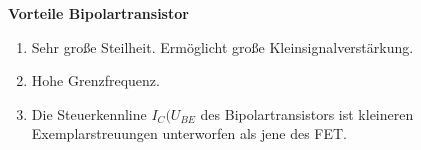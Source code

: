 \textbf{Vorteile Bipolartransistor}
\begin{enumerate}
    \item Sehr große Steilheit. Ermöglicht große Kleinsignalverstärkung. 
    \item Hohe Grenzfrequenz. 
    \item Die Steuerkennline $I_C(U_{BE}$ des Bipolartransistors ist kleineren Exemplarstreuungen unterworfen als jene des FET. 
\end{enumerate}